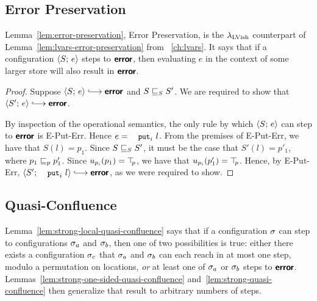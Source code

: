 \subsection{Error Preservation}

Lemma~\ref{lem:error-preservation}, Error Preservation, is the
$\lambda_{\textrm{LVish}}$ counterpart of Lemma~\ref{lem:lvars-error-preservation}
from ~\ref{ch:lvars}.  It says that if a configuration
$\langle S;\, e \rangle$ steps to $\textbf{\textsf{error}}$, then evaluating $e$ in the context
of some larger store will also result in $\textbf{\textsf{error}}$.

\LemErrorPreservation
\ifdefined\DISSERTATION
\begin{proof}
  Suppose $\config{S}{e} \parstepsto \error$ and
  $S \sqsubseteq_S S'$. We are required to show that $\config{S'}{e}
  \parstepsto \error$.

  By inspection of the operational semantics, the only rule by which
  $\langle S;\, e \rangle$ can step to $\textbf{\textsf{error}}$ is {\sc E-Put-Err}.  Hence $e =
  \putiexp{l}$.  From the premises of {\sc E-Put-Err}, we have that
  $S(l) = p_1$.  Since $S \sqsubseteq_S S'$, it must be the case that
  $S'(l) = p'_1$, where $p_1 \sqsubseteq_p p'_1$.  Since $u_{p_i}(p_1) =
  \top\hspace{-0.85mm}_{p}$, we have that $u_{p_i}(p'_1) = \top\hspace{-0.85mm}_{p}$.  Hence, by {\sc
    E-Put-Err}, $\config{S'}{\putiexp{l}} \parstepsto \error$, as we
  were required to show.
\end{proof}
\fi

\subsection{Quasi-Confluence}\label{subsection:quasi-quasi-confluence}

Lemma~\ref{lem:strong-local-quasi-confluence} says that if a
configuration $\sigma$ can step to configurations $\sigma_a$ and
$\sigma_b$, then one of two possibilities is true: either there exists
a configuration $\sigma_c$ that $\sigma_a$ and $\sigma_b$ can each reach
in at most one step, modulo a permutation on locations, \emph{or} at
least one of $\sigma_a$ or $\sigma_b$ steps to $\textbf{\textsf{error}}$.
Lemmas~\ref{lem:strong-one-sided-quasi-confluence}
and~\ref{lem:strong-quasi-confluence} then generalize that result to
arbitrary numbers of steps.

